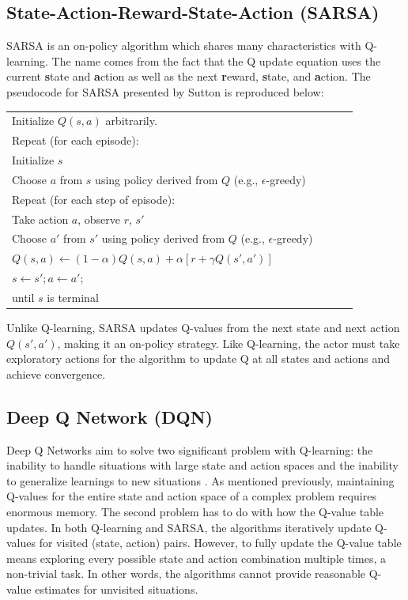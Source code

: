 \subsection{State-Action-Reward-State-Action (SARSA)}
SARSA is an on-policy algorithm which shares many characteristics with Q-learning. The name comes from the fact that the Q update equation uses the current \textbf{s}tate and \textbf{a}ction as well as the next \textbf{r}eward, \textbf{s}tate, and \textbf{a}ction. The pseudocode for SARSA presented by Sutton is reproduced below:
\begin{center} \begin{tabular}{|p{0.9\linewidth}|}\hline %
Initialize $Q(s,a)$ arbitrarily. \\
Repeat (for each episode): \\
\qquad Initialize $s$\\
\qquad Choose $a$ from $s$ using policy derived from $Q$ (e.g., $\epsilon$-greedy)\\
\qquad Repeat (for each step of episode):\\
\qquad \qquad Take action $a$, observe $r$, $s'$\\
\qquad \qquad Choose $a'$ from $s'$ using policy derived from $Q$ (e.g., $\epsilon$-greedy)\\
\qquad \qquad $	Q(s,a)\gets (1-\alpha)Q(s,a) + \alpha [r + \gamma Q(s',a')]$\\
\qquad \qquad $s \gets s'; a \gets a'$;\\
\qquad until $s$ is terminal \\
\hline
\end{tabular} \end{center}

Unlike Q-learning, SARSA updates Q-values from the next state and next action $Q(s',a')$, making it an on-policy strategy. Like Q-learning, the actor must take exploratory actions for the algorithm to update Q at all states and actions and achieve convergence.

\subsection{Deep Q Network (DQN)}
Deep Q Networks aim to solve two significant problem with Q-learning: the inability to handle situations with large state and action spaces and the inability to generalize learnings to new situations \cite{sutton_policygrad}. As mentioned previously, maintaining Q-values for the entire state and action space of a complex problem requires enormous memory. The second problem has to do with how the Q-value table updates. In both Q-learning and SARSA, the algorithms iteratively update Q-values for visited (state, action) pairs. However, to fully update the Q-value table means exploring every possible state and action combination multiple times, a non-trivial task. In other words, the algorithms cannot provide reasonable Q-value estimates for unvisited situations.

